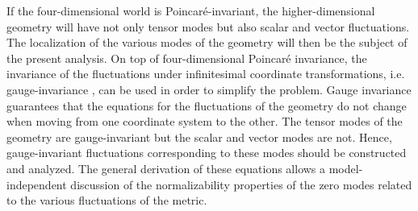 \documentclass[a4paper,12pt]{article}
\begin{document}
If the four-dimensional world is Poincar\'e-invariant, the higher-dimensional 
geometry will have not only tensor modes but also scalar and  vector 
fluctuations. The localization of the 
various modes of the geometry will then be the subject of the present 
analysis. On top of four-dimensional Poincar\'e invariance, 
the invariance of the fluctuations under infinitesimal coordinate 
transformations, i.e. gauge-invariance \cite{bardeen}, can be used 
in order to simplify the problem.
Gauge invariance guarantees that the equations for the fluctuations 
of the geometry do not change when moving from one coordinate system 
to the other. The tensor modes of the geometry are gauge-invariant 
but the scalar and vector modes are not. Hence, gauge-invariant
fluctuations corresponding to these modes should be constructed and analyzed.
The general derivation of these equations allows a model-independent
 discussion of the 
normalizability properties of the zero modes related to the various
fluctuations of the metric.
\end{document}
